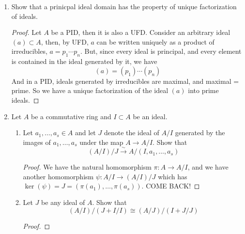 \documentclass[hidelinks,12pt]{article}
\begin{document}
\begin{enumerate}
\begin{proof}
        \end{proof}
    \item Show that a prinicpal ideal domain has the property of unique factorization of ideals.
        \begin{proof}
        Let \(A\) be a PID, then it is also a UFD. Consider an arbitrary ideal \((a)\subset A\), then, by UFD, \(a\) can be written uniquely as a product of irreducibles, \(a=p_{1}\cdots p_{n}\). But, since every ideal is principal, and every element is contained in the ideal generated by it, we have \[
            (a)=(p_{1})\cdots(p_{n})
        \]
        And in a PID, ideals generated by irreducibles are maximal, and maximal = prime. So we have a unique factorization of the ideal \((a)\) into prime ideals. 
        \end{proof}
    \item Let \(A\) be a commutative ring and \(I\subset A\) be an ideal.
        \begin{enumerate}[label=(\alph*).]
            \item Let \(a_{1},\dots,a_{s}\in A\) and let \(J\) denote the ideal of \(A/I\) generated by the images of \(a_{1},\dots,a_{s}\) under the map \(A\to A/I\). Show that \[
                    (A/I)/J\overset{\sim}{\to} A/(I,a_{1},\dots,a_{s})
            \]
            \begin{proof}
           We have the natural homomorphism \(\pi:A\to A/I\), and we have another homomorphism \(\psi:A/I\to (A/I)/J\) which has \(\ker(\psi)=J=(\pi(a_{1}),\dots,\pi(a_{s}))\). COME BACK!
            \end{proof}
            \item Let \(J\) be any ideal of \(A\). Show that \[
                    (A/I)/(J+I/I)\cong(A/J)/(I+J/J)
            \]
           \begin{proof}
           

\end{proof}
\end{enumerate}
\end{enumerate}
\end{document}

